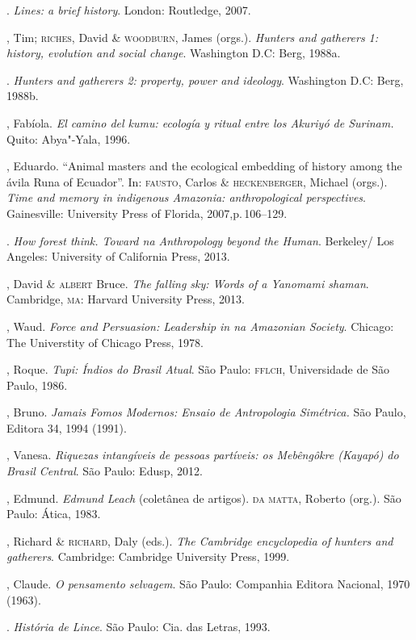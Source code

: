 \begin{bibliohedra}
\titidem. \emph{Lines: a brief history}. London: Routledge, 2007.

, Tim; \textsc{riches}, David \& \textsc{woodburn}, James (orgs.).
\emph{Hunters and gatherers 1: history, evolution and social change}. Washington D.C: Berg, 1988a.

\titidem. \emph{Hunters and gatherers 2: property, power and
ideology}. Washington D.C: Berg, 1988b.

, Fabíola. \emph{El camino del kumu: ecología y ritual entre los
Akuriyó de Surinam.} Quito: Abya"-Yala, 1996.

, Eduardo. ``Animal masters and the ecological embedding of history
among the ávila Runa of Ecuador''. In: \textsc{fausto}, Carlos \& \textsc{heckenberger}, Michael (orgs.). \emph{Time and memory in indigenous Amazonia:
anthropological perspectives}. Gainesville: University Press of Florida, 2007,p.\,106--129.

\titidem. \emph{How forest think. Toward na Anthropology beyond the
Human}. Berkeley/ Los Angeles: University of California Press, 2013.

, David \& \textsc{albert} Bruce. \emph{The falling sky: Words of a Yanomami shaman}. Cambridge, \textsc{ma}: Harvard University Press, 2013.

, Waud. \emph{Force and Persuasion: Leadership in na Amazonian
Society}. Chicago: The Universtity of Chicago Press, 1978.

, Roque. \emph{Tupi: Índios do Brasil Atual}. São Paulo: \textsc{fflch},
Universidade de São Paulo, 1986.

, Bruno. \emph{Jamais Fomos Modernos: Ensaio de
Antropologia Simétrica.} São Paulo, Editora 34, 1994 (1991).

, Vanesa. \emph{Riquezas intangíveis de pessoas partíveis: os
Mebêngôkre (Kayapó) do Brasil Central}. São Paulo: Edusp, 2012.

, Edmund. \emph{Edmund Leach} (coletânea de artigos). \textsc{da matta},
Roberto (org.). São Paulo: Ática, 1983.

, Richard \& \textsc{richard}, Daly (eds.). \emph{The Cambridge encyclopedia of hunters and gatherers}. Cambridge: Cambridge University Press, 1999.

, Claude. \emph{O pensamento selvagem}. São Paulo:
Companhia Editora Nacional, 1970 (1963).

\titidem. \emph{História de Lince}. São Paulo: Cia. das Letras, 1993.


\end{bibliohedra}
